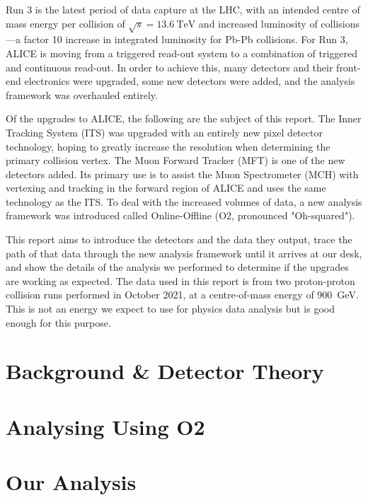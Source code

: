 \documentclass[11pt]{article}
\numberwithin{equation}{section}
\numberwithin{figure}{section}
\numberwithin{table}{section}
\begin{document}
Run 3 is the latest period of data capture at the LHC, with an intended centre of mass energy per collision of $\sqrt{s}=\SI{13.6}{\tera\electronvolt}$ and increased luminosity of collisions---a factor 10 increase in integrated luminosity for Pb-Pb collisions. For Run 3, ALICE is moving from a triggered read-out system to a combination of triggered and continuous read-out. In order to achieve this, many detectors and their front-end electronics were upgraded, some new detectors were added, and the analysis framework was overhauled entirely. 

Of the upgrades to ALICE, the following are the subject of this report. The Inner Tracking System (ITS) was upgraded with an entirely new pixel detector technology, hoping to greatly increase the resolution when determining the primary collision vertex. The Muon Forward Tracker (MFT) is one of the new detectors added. Its primary use is to assist the Muon Spectrometer (MCH) with vertexing and tracking in the forward region of ALICE and uses the same technology as the ITS. To deal with the increased volumes of data, a new analysis framework was introduced called Online-Offline (O2, pronounced "Oh-squared"). 

This report aims to introduce the detectors and the data they output, trace the path of that data through the new analysis framework until it arrives at our desk, and show the details of the analysis we performed to determine if the upgrades are working as expected. The data used in this report is from two proton-proton collision runs performed in October 2021, at a centre-of-mass energy of \SI{900}{\giga\electronvolt}. This is not an energy we expect to use for physics data analysis but is good enough for this purpose.

\section{Background \& Detector Theory}\label{sec:Background_Detector}


\section{Analysing Using O2}\label{sec:AnalysingWithO2}


\section{Our Analysis}\label{sec:OurAnalysis}

\end{document}
